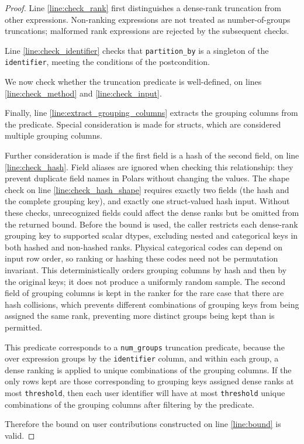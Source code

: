 \documentclass{article}
\begin{document}
\begin{proof}
    Line \ref{line:check_rank} first distinguishes a dense-rank truncation
    from other expressions. Non-ranking expressions are not treated as
    number-of-groups truncations; malformed rank expressions are rejected
    by the subsequent checks.

    Line \ref{line:check_identifier} checks that \texttt{partition\_by} is a singleton of the \texttt{identifier}, meeting the conditions of the postcondition.

    We now check whether the truncation predicate is well-defined, on lines \ref{line:check_method} and \ref{line:check_input}.

    Finally, line \ref{line:extract_grouping_columns} extracts the grouping columns from the predicate.
    Special consideration is made for structs, which are considered multiple grouping columns.

    Further consideration is made if the first field is a hash of the second field, on line \ref{line:check_hash}.
    Field aliases are ignored when checking this relationship: they prevent duplicate
    field names in Polars without changing the values.
    The shape check on line \ref{line:check_hash_shape} requires exactly two fields
    (the hash and the complete grouping key), and exactly one struct-valued hash input. Without these checks, unrecognized
    fields could affect the dense ranks but be omitted from the returned bound.
    Before the bound is used, the caller restricts each dense-rank grouping
    key to supported scalar dtypes, excluding nested and categorical keys
    in both hashed and non-hashed ranks.
    Physical categorical codes can depend on input row order, so ranking or hashing
    these codes need not be permutation invariant.
    This deterministically orders grouping columns by hash and then by the original keys; it does not produce a uniformly random sample.
    The second field of grouping columns is kept in the ranker for the rare case that there are hash collisions,
    which prevents different combinations of grouping keys from being assigned the same rank,
    preventing more distinct groups being kept than is permitted.

    This predicate corresponds to a \texttt{num\_groups} truncation predicate,
    because the over expression groups by the \texttt{identifier} column,
    and within each group, a dense ranking is applied to unique combinations of the grouping columns.
    If the only rows kept are those corresponding to grouping keys assigned dense ranks at most \texttt{threshold},
    then each user identifier will have at most \texttt{threshold} unique combinations of the grouping columns
    after filtering by the predicate.

    Therefore the bound on user contributions constructed on line \ref{line:bound} is valid.
\end{proof}
\end{document}
